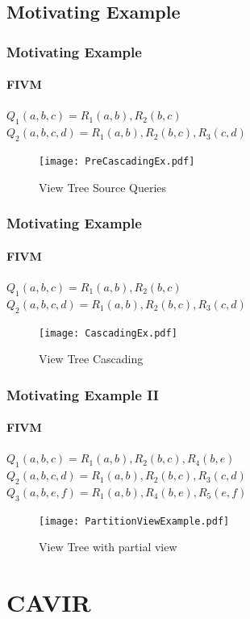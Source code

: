 \documentclass[
	11pt, %
]{beamer}
\begin{document}
\subsection{Motivating Example}
\begin{frame}
	\frametitle{Motivating Example}
	\framesubtitle{FIVM}
	$Q_1(a, b, c) = R_1(a,b), R_2(b,c)$\\
	$Q_2(a, b, c, d) = R_1(a,b), R_2(b,c), R_3(c,d)$
		\begin{figure}
		\texttt{[image: PreCascadingEx.pdf]}
		\caption{View Tree Source Queries}
	\end{figure}
\end{frame}
\begin{frame}
	\frametitle{Motivating Example}
	\framesubtitle{FIVM}
	$Q_1(a, b, c) = R_1(a,b), R_2(b,c)$\\
	$Q_2(a, b, c, d) = R_1(a,b), R_2(b,c), R_3(c,d)$
	\begin{figure}
		\texttt{[image: CascadingEx.pdf]}
		\caption{View Tree Cascading}
	\end{figure}
\end{frame}

\begin{frame}
	\frametitle{Motivating Example II}
	\framesubtitle{FIVM}
	$Q_1(a, b, c) = R_1(a,b), R_2(b,c), R_4(b,e)$\\
	$Q_2(a, b, c, d) = R_1(a,b), R_2(b,c), R_3(c,d)$\\
	$Q_3(a,b,e,f) = R_1(a,b), R_4(b,e), R_5(e,f)$
	\begin{figure}
		\texttt{[image: PartitionViewExample.pdf]}
		\caption{View Tree with partial view}
	\end{figure}
\end{frame}


\section{CAVIR}
\end{document}
